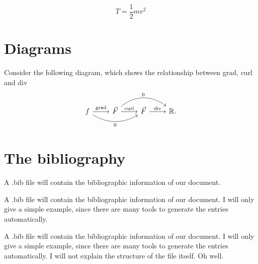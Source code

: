 \documentclass[12pt, a4paper]{article} %
\theoremstyle{plainspaced}
\numberwithin{equation}{section}
\begin{document}
\begin{equation}
	T = \frac{1}{2}m v^2
\end{equation}

\section{Diagrams}
Consider the following diagram, which shows the relationship between grad, curl 
and div
\begin{equation*}
\begin{tikzcd}
f \arrow{r}{\text{grad}} \arrow[swap, bend right=30]{rr}{0} & \vec{F} 
\arrow[bend left=40]{rr}{0}
\arrow{r}{\text{curl}}  &  \vec{F} 
\arrow{r}{\text{div}}  & \mathbb{R}  .
\end{tikzcd}
\end{equation*}


\section{The bibliography}

A .bib file will contain the bibliographic information of our document.

A .bib file will contain the bibliographic information of our document. I will only give a simple example, since there are many tools to generate the entries automatically.

A .bib file will contain the bibliographic information of our document. I will only give a simple example, since there are many tools to generate the entries automatically. I will not explain the structure of the file itself. Oh well.


\end{document}
